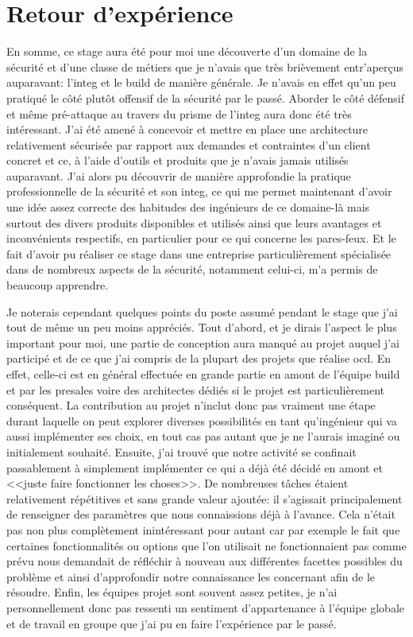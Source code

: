 \documentclass[12pt, oneside, a4paper, titlepage]{report}
\begin{document}
\section{Retour d'expérience}%
\label{sec:bilan::ret-exp}

En somme, ce stage aura été pour moi une découverte d'un domaine de la sécurité
et d'une classe de métiers que je n'avais que très brièvement entr'aperçus
auparavant: l'\gls{integ} et le \gls{build} de manière générale. Je n'avais en
effet qu'un peu pratiqué le côté plutôt offensif de la sécurité par le passé.
Aborder le côté défensif et même pré-attaque au travers du prisme de
l'\gls{integ} aura donc été très intéressant. J'ai été amené à concevoir et
mettre en place une architecture relativement sécurisée par rapport aux demandes
et contraintes d'un client concret et ce, à l'aide d'outils et produits que je
n'avais jamais utilisés auparavant. J'ai alors pu découvrir de manière
approfondie la pratique professionnelle de la sécurité et son \gls{integ}, ce
qui me permet maintenant d'avoir une idée assez correcte des habitudes des
ingénieurs de ce domaine-là mais surtout des divers produits disponibles et
utilisés ainsi que leurs avantages et inconvénients respectifs, en particulier
pour ce qui concerne les pares-feux. Et le fait d'avoir pu réaliser ce stage
dans une entreprise particulièrement spécialisée dans de nombreux aspects de la
sécurité, notamment celui-ci, m'a permis de beaucoup apprendre.

Je noterais cependant quelques points du poste assumé pendant le stage que j'ai
tout de même un peu moins appréciés. Tout d'abord, et je dirais l'aspect le plus
important pour moi, une partie de conception aura manqué au projet auquel j'ai
participé et de ce que j'ai compris de la plupart des projets que réalise
\gls{ocd}. En effet, celle-ci est en général effectuée en grande partie en amont
de l'équipe \gls{build} et par les \gls{presales} voire des architectes dédiés
si le projet est particulièrement conséquent. La contribution au projet n'inclut
donc pas vraiment une étape durant laquelle on peut explorer diverses
possibilités en tant qu'ingénieur qui va aussi implémenter ses choix, en tout
cas pas autant que je ne l'aurais imaginé ou initialement souhaité. Ensuite,
j'ai trouvé que notre activité se confinait passablement à simplement
implémenter ce qui a déjà été décidé en amont et <<juste faire fonctionner les
choses>>. De nombreuses tâches étaient relativement répétitives et sans grande
valeur ajoutée: il s'agissait principalement de renseigner des paramètres que
nous connaissions déjà à l'avance. Cela n'était pas non plus complètement
inintéressant pour autant car par exemple le fait que certaines fonctionnalités
ou options que l'on utilisait ne fonctionnaient pas comme prévu nous demandait
de réfléchir à nouveau aux différentes facettes possibles du problème et ainsi
d'approfondir notre connaissance les concernant afin de le résoudre.  Enfin, les
équipes projet sont souvent assez petites, je n'ai personnellement donc pas
ressenti un sentiment d'appartenance à l'équipe globale et de travail en groupe
que j'ai pu en faire l'expérience par le passé.
\end{document}
